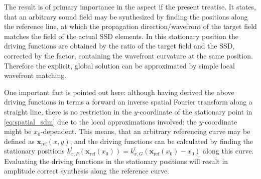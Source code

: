 \documentclass[12pt,a4paper]{article}
\newcommand{\vxref}{\mathbf{x}_{\mathrm{ref}}}
\begin{document}
The result is of primary importance in the aspect if the present treatise.
It states, that an arbitrary sound field may be synthesized by finding the positions along the reference line, at which the propagation direction/wavefront of the target field matches the field of the actual SSD elements.
In this stationary position the driving functions are obtained by the ratio of the target field and the SSD, corrected by the factor, containing the wavefront curvature at the same position.
Therefore the explicit, global solution can be approximated by simple local wavefront matching.

One important fact is pointed out here: although having derived the above driving functions in terms a forward an inverse spatial Fourier transform along a straight line, there is no restriction in the $y$-coordinate of the stationary point in \eqref{eq:spatial_sdm} due to the local approximations involved: the $y$-coordinate might be $x_0$-dependent.
This means, that an arbitrary referencing curve may be defined as $\vxref(x,y)$, and the driving functions can be calculated by finding the stationary positions $k_{x,P}^l(\vxref(x_0)) = k_{x,G}^l(\vxref(x_0) - x_0)$ along this curve.
Evaluating the driving functions in the stationary positions will result in amplitude correct synthesis along the reference curve. 
\end{document}
